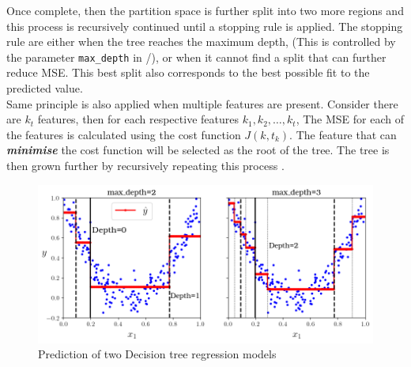 Once complete, then the partition space is further split into two more regions and this process is recursively continued until a stopping rule is applied. The stopping rule are either when the tree reaches the maximum depth, (This is controlled by the parameter {\tt max\_depth} in \scikit/), or when it cannot find a split that can further reduce MSE. This best split also corresponds to the best possible fit to the predicted value.\\ 

Same principle is also applied when multiple features are present. Consider there are $k_t$ features, then for each respective features $k_1,k_2,\dots,k_t$, The MSE for each of the features is calculated using the cost function $J(k,t_k)$. The feature that can \emph{\textbf{minimise}} the cost function will be selected as the root of the tree. The tree is then grown further by recursively repeating this process \citep{Hastie.2009,Geron.2019}.\\

\begin{figure}[h]
    \centering
    \includegraphics[width=.9\textwidth]{02_figures/fig6_5_partspace_geron09.png}
    \caption{Prediction of two Decision tree regression models \citep{Geron.2019}}
    \label{fig:geron6_5}
\end{figure}

